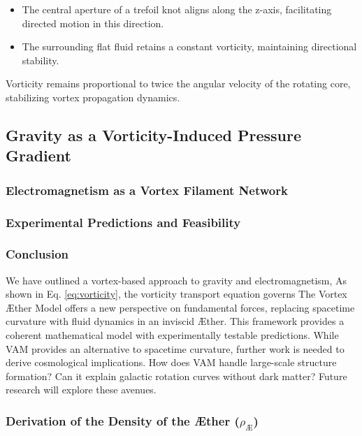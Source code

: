 \begin{itemize}
    \item The central aperture of a trefoil knot aligns along the z-axis, facilitating directed motion in this direction.
    \item The surrounding flat fluid retains a constant vorticity, maintaining directional stability.
\end{itemize}
Vorticity remains proportional to twice the angular velocity of the rotating core, stabilizing vortex propagation dynamics.


\subsection{Gravity as a Vorticity-Induced Pressure Gradient}\label{sec:gravity-as-a-vorticity-induced-pressure-gradient}
    \subsubsection*{Electromagnetism as a Vortex Filament Network}\label{sec:electromagnetism-as-a-vortex-filament-network}
    \subsubsection*{Experimental Predictions and Feasibility}\label{sec:experimental-predictions-and-feasibility}
    \subsubsection*{Conclusion}\label{sec:conclusion}
    We have outlined a vortex-based approach to gravity and electromagnetism, As shown in Eq. \eqref{eq:vorticity}, the vorticity transport equation governs  The Vortex \AE ther Model offers a new perspective on fundamental forces,
    replacing spacetime curvature with fluid dynamics in an inviscid \AE ther.
    This framework provides a coherent mathematical model with experimentally testable predictions.
    While VAM provides an alternative to spacetime curvature, further work is needed to derive cosmological implications.
    How does VAM handle large-scale structure formation?
    Can it explain galactic rotation curves without dark matter?
    Future research will explore these avenues.









        \subsubsection*{Derivation of the Density of the \AE ther ($\rho_\text{\AE}$)}\label{sec:derivation-of-the-density-of-the-ae{}ther-($rho_text{ae}$)}

